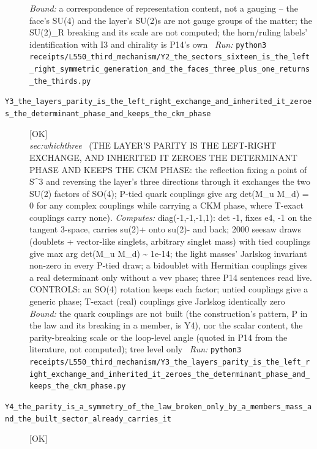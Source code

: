 \begin{description}
 \emph{Bound:} a correspondence of representation content, not a gauging -- the face's SU(4) and the layer's SU(2)s are not gauge groups of the matter; the SU(2)\_R breaking and its scale are not computed; the horn/ruling labels' identification with I3 and chirality is P14's own
\ \emph{Run:} \texttt{python3 receipts/L550\_third\_mechanism/Y2\_the\_sectors\_sixteen\_is\_the\_left\_right\_symmetric\_generation\_and\_the\_faces\_three\_plus\_one\_returns\_the\_thirds.py}
\item[\label{rcpt:Y3_the_layers_parity_is_the_left_right_exchange_and_inherited_it_zeroes_the_determinant_phase_and_keeps_the_ckm_phase}\textbf{}\quad\texttt{Y3\_the\_layers\_parity\_is\_the\_left\_right\_exchange\_and\_inherited\_it\_zeroes\_the\_determinant\_phase\_and\_keeps\_the\_ckm\_phase}]\hfill\textsf{[OK]}\\
\textit{sec:whichthree} \ (THE LAYER'S PARITY IS THE LEFT-RIGHT EXCHANGE, AND INHERITED IT ZEROES THE DETERMINANT PHASE AND KEEPS THE CKM PHASE: the reflection fixing a point of S\textasciicircum{}3 and reversing the layer's three directions through it exchanges the two SU(2) factors of SO(4); P-tied quark couplings give arg det(M\_u M\_d) = 0 for any complex couplings while carrying a CKM phase, where T-exact couplings carry none). 
\emph{Computes:} diag(-1,-1,-1,1): det -1, fixes e4, -1 on the tangent 3-space, carries su(2)+ onto su(2)- and back; 2000 seesaw draws (doublets + vector-like singlets, arbitrary singlet mass) with tied couplings give max \textbar{}arg det(M\_u M\_d)\textbar{} \textasciitilde{} 1e-14; the light masses' Jarlskog invariant non-zero in every P-tied draw; a bidoublet with Hermitian couplings gives a real determinant only without a vev phase; three P14 sentences read live. CONTROLS: an SO(4) rotation keeps each factor; untied couplings give a generic phase; T-exact (real) couplings give Jarlskog identically zero
 \emph{Bound:} the quark couplings are not built (the construction's pattern, P in the law and its breaking in a member, is Y4), nor the scalar content, the parity-breaking scale or the loop-level angle (quoted in P14 from the literature, not computed); tree level only
\ \emph{Run:} \texttt{python3 receipts/L550\_third\_mechanism/Y3\_the\_layers\_parity\_is\_the\_left\_right\_exchange\_and\_inherited\_it\_zeroes\_the\_determinant\_phase\_and\_keeps\_the\_ckm\_phase.py}
\item[\label{rcpt:Y4_the_parity_is_a_symmetry_of_the_law_broken_only_by_a_members_mass_and_the_built_sector_already_carries_it}\textbf{}\quad\texttt{Y4\_the\_parity\_is\_a\_symmetry\_of\_the\_law\_broken\_only\_by\_a\_members\_mass\_and\_the\_built\_sector\_already\_carries\_it}]\hfill\textsf{[OK]}\\

\end{description}
